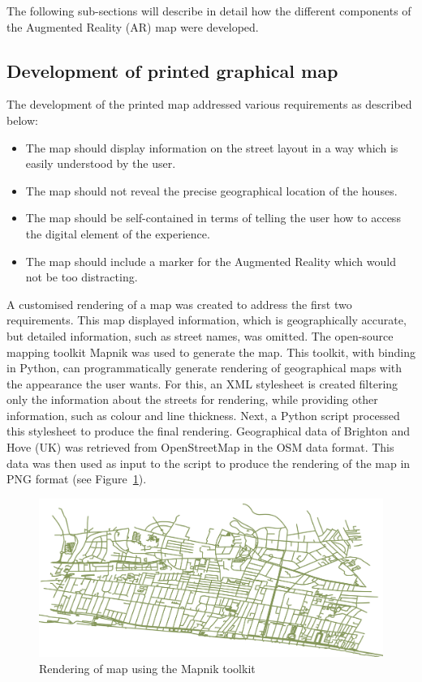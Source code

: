 \documentclass[acmlarge,screen,dvipsnames]{acmart}
\begin{document}
The following sub-sections will describe in detail how the different
components of the Augmented Reality (AR) map were developed.

\subsection{Development of printed graphical map} %
The development of the printed map addressed various requirements as described
below:

\begin{itemize} 
  \item The map should display information on the street layout in a way which is easily understood by the user. 
  \item The map should not reveal the precise geographical location of the houses. 
  \item The map should be self-contained in terms of telling the user how to access 
  the digital element of the experience. 
  \item The map should include a marker for the Augmented Reality which would not be too distracting. 
\end{itemize}

A customised rendering of a
map was created to address the first two requirements. This map displayed information, which is geographically
accurate, but detailed information, such as street names, was omitted. The
open-source mapping toolkit Mapnik \cite{mapnik} was used to generate the map.
This toolkit, with binding in Python, can programmatically generate rendering
of geographical maps with the appearance the user wants. For this, an XML
stylesheet is created filtering only the information about the streets for
rendering, while providing other information, such as colour and line thickness.
Next, a Python script processed this stylesheet to produce the final
rendering. Geographical data of Brighton and Hove (UK) was retrieved from OpenStreetMap
\cite{OpenStreetMap} in the OSM data format. This data was then used as input
to the script to produce the rendering of the map in PNG format (see
Figure~\ref{fig:map}).

\begin{figure}[h]
\includegraphics[width=\linewidth]{images/maprender.jpg}
\caption{Rendering of map using the Mapnik toolkit} \label{fig:map} 
\end{figure}
 
\end{document}
